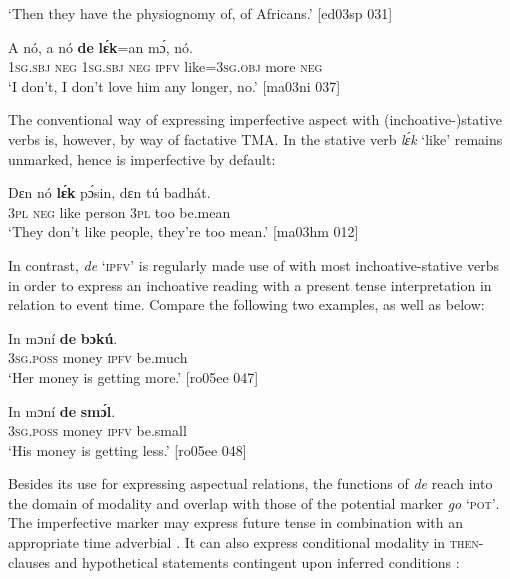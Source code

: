 \glt ‘Then they have the physiognomy of, of Africans.’ [ed03sp 031]
\z


\ea%
    \label{ex:key:334}
    \gll A    nó,  a    nó  \textbf{de}  \textbf{lɛ́k}=an    mɔ́,    nó.\\
\textsc{1sg.sbj}  \textsc{neg}  \textsc{1sg.sbj}  \textsc{neg}  \textsc{ipfv}  like=\textsc{3sg.obj}  more  \textsc{neg}\\

\glt ‘I don’t, I don’t love him any longer, no.’ [ma03ni 037]
\z

The conventional way of expressing imperfective aspect with (inchoative-)stative verbs is, however, by way of factative TMA{\fff}. In  the stative verb \textit{lɛ́k} ‘like’ remains unmarked, hence is imperfective by default:{\fff} 


\ea%
    \label{ex:key:335}
    \gll Dɛn    nó  \textbf{lɛ́k}  pɔ́sin,  dɛn  tú  badhát.\\
\textsc{3pl}    \textsc{neg}  like  person  \textsc{3pl}  too  be.mean\\

\glt ‘They don’t like people, they’re too mean.’ [ma03hm 012]
\z

In contrast, \textit{de} ‘\textsc{ipfv}’ is regularly made use of with most inchoative-stative verbs in order to express an inchoative reading with a present tense interpretation in relation to event time. Compare the following two examples, as well as  below: 


\ea%
    \label{ex:key:336}
    \gll In    mɔní  \textbf{de} \textbf{bɔkú}.\\
\textsc{3sg.poss}  money  \textsc{ipfv}  be.much\\

\glt ‘Her money is getting more.’ [ro05ee 047]
\z


\ea%
    \label{ex:key:337}
    \gll In    mɔní  \textbf{de} \textbf{smɔ́l}.\\
\textsc{3sg.poss}  money  \textsc{ipfv}  be.small\\

\glt ‘His money is getting less.’ [ro05ee 048]
\z

Besides its use for expressing aspectual relations, the functions of \textit{de} reach into the domain of modality and overlap with those of the potential marker \textit{go} ‘\textsc{pot’}. The imperfective marker may express future tense in combination with an appropriate time adverbial . It can also express conditional modality in \textsc{then-}clauses and hypothetical statements contingent upon inferred conditions :


